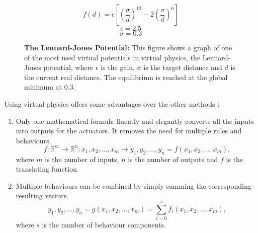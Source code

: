 \documentclass[oneside, a4paper, 12pt]{memoir}
\let\oldCaption\caption
\renewcommand{\caption}[2]{
\oldCaption[#1]{{\small\sffamily\bfseries #1:} #2}
}
\begin{document}
	\begin{figure}
	\begin{minipage}[c]{0.6\textwidth}
	\end{minipage}
	\hfill
	\begin{minipage}[c]{0.4\textwidth}
		$$f(d) = \epsilon \left[ \left(\frac{\sigma}{d}\right)^{12} - 2 \left(\frac{\sigma}{d}\right)^6 \right]$$
		$$\epsilon = 2.5$$
		$$\sigma = 0.3$$
	\end{minipage}
		
		\caption{The Lennard-Jones Potential}{This figure shows a graph of one of the most used virtual potentials in virtual physics, the Lennard-Jones potential, where $\epsilon$ is the gain, $\sigma$ is the target distance and $d$ is the current real distance. The equilibrium is reached at the global minimum at $0.3$.}
		\label{fig:lennard-jones_potential}
	\end{figure}
	
	Using virtual physics offers some advantages over the other methods \citep{brambilla2013swarm}:
	
	\begin{enumerate}
		\item Only one mathematical formula fluently and elegantly converts all the inputs into outputs for the actuators. It removes the need for multiple rules and behaviours.
		$$f:\mathbb{R}^m \rightarrow \mathbb{R}^n:x_1,x_2,...,x_m \rightarrow y_1,y_2,...,y_n = f(x_1,x_2,...,x_m)\mbox{,}$$ where $m$ is the number of inputs, $n$ is the number of outputs and $f$ is the translating function.
		
		\item Multiple behaviours can be combined by simply summing the corresponding resulting vectors.
		$$y_1,y_2,...,y_n = g(x_1,x_2,...,x_m) = \sum_{i=0}^{s}{f_i(x_1,x_2,...,x_m)}\mbox{,}$$ where $s$ is the number of behaviour components.
	\end{enumerate}
	
\end{document}
